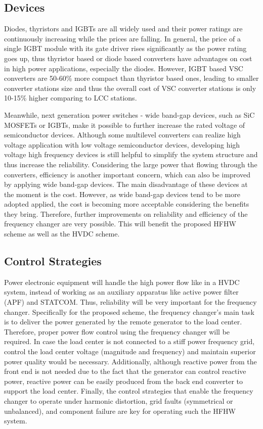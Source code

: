 \documentclass[12pt,a4paper]{reportmod}
\begin{document}
\subsection{Devices}
\par Diodes, thyristors and IGBTs are all widely used and their power ratings are continuously increasing while the prices are falling. In general, the price of a single IGBT module with its gate driver rises significantly as the power rating goes up, thus thyristor based or diode based converters have advantages on cost in high power applications, especially the diodes. However, IGBT based VSC converters are 50-60\% more compact than thyristor based ones, leading to smaller converter stations size and thus the overall cost of VSC converter stations is only 10-15\% higher comparing to LCC stations.
\par Meanwhile, next generation power switches - wide band-gap devices, such as SiC MOSFETs or IGBTs, make it possible to further increase the rated voltage of semiconductor devices. Although some multilevel converters can realize high voltage application with low voltage semiconductor devices, developing high voltage high frequency devices is still helpful to simplify the system structure and thus increase the reliability. Considering the large power that flowing through the converters, efficiency is another important concern, which can also be improved by applying wide band-gap devices. The main disadvantage of these devices at the moment is the cost. However, as wide band-gap devices tend to be more adopted applied, the cost is becoming more acceptable considering the benefits they bring. Therefore, further improvements on reliability and efficiency of the frequency changer are very possible. This will benefit the proposed HFHW scheme as well as the HVDC scheme.
\subsection{Control Strategies}
\par Power electronic equipment will handle the high power flow like in a HVDC system, instead of working as an auxiliary apparatus like active power filter (APF) and STATCOM. Thus, reliability will be very important for the frequency changer. Specifically for the proposed scheme, the frequency changer's main task is to deliver the power generated by the remote generator to the load center. Therefore, proper power flow control using the frequency changer will be required. In case the load center is not connected to a stiff power frequency grid, control the load center voltage (magnitude and frequency) and maintain superior power quality would be necessary. Additionally, although reactive power from the front end is not needed due to the fact that the generator can control reactive power, reactive power can be easily produced from the back end converter to support the load center. Finally, the control strategies that enable the frequency changer to operate under harmonic distortion, grid faults (symmetrical or unbalanced), and component failure are key for operating such the HFHW system.
\end{document}
